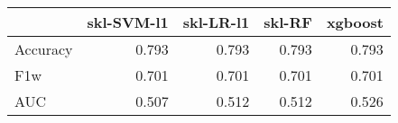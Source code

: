 \begin{tabular}{lrrrr}
\toprule
{} &  skl-SVM-l1 &  skl-LR-l1 &  skl-RF &  xgboost \\
\midrule
Accuracy &       0.793 &      0.793 &   0.793 &    0.793 \\
F1w      &       0.701 &      0.701 &   0.701 &    0.701 \\
AUC      &       0.507 &      0.512 &   0.512 &    0.526 \\
\bottomrule
\end{tabular}
